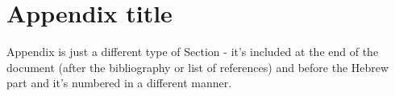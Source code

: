 \chapter{Appendix title}

Appendix is just a different type of Section - it's included at the
end of the document (after the bibliography or list of references)
and before the Hebrew part and it's numbered in a different manner.